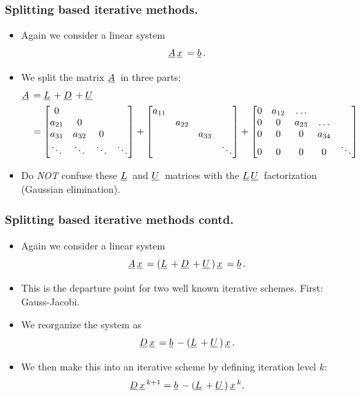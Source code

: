 \documentclass{beamer}
\newcommand{\ub}[1]{\underbar{$#1$}\,}
\begin{document}
\begin{frame}\frametitle{Splitting based iterative methods.}
  \begin{itemize}
    \item Again we consider a linear system
      \[
        \ub{A}\ub{x} = \ub{b}.
      \]
    \item We split the matrix $\ub{A}$ in three parts; \tiny
      \[
        \begin{split}
          \ub{A} &= \ub{L} + \ub{D} + \ub{U} \\
                 &= \begin{bmatrix}
                      0 & \\
                      a_{21} & 0\\
                      a_{31} & a_{32} & 0\\
                      \ddots & \ddots & \ddots & \ddots
                    \end{bmatrix} +
                    \begin{bmatrix}
                      a_{11} \\
                             & a_{22} \\
                             &        & a_{33} \\
                             &        &       & \ddots
                    \end{bmatrix}+
                    \begin{bmatrix}
                      0 & a_{12} & \dots \\
                      0 & 0      & a_{23} & \dots \\
                      0 & 0      & 0      & a_{34}  \\
                      0 & 0      & 0      & 0 & \ddots
                    \end{bmatrix}
        \end{split}
      \] \normalsize
    \item Do \emph{NOT} confuse these $\ub{L}$ and $\ub{U}$ matrices with the $\ub{L}\ub{U}$ factorization (Gaussian elimination).
  \end{itemize}
\end{frame}
\begin{frame}\frametitle{Splitting based iterative methods contd.}
  \begin{itemize}
    \item Again we consider a linear system
      \[
        \ub{A}\ub{x} = \left(\ub{L}+\ub{D}+\ub{U}\right)\ub{x} = \ub{b}.
      \]
    \item This is the departure point for two well known iterative schemes. First: Gauss-Jacobi.
    \item We reorganize the system as
      \[
        \ub{D}\ub{x} = \ub{b}-\left(\ub{L}+\ub{U}\right)\ub{x}.
      \]
    \item We then make this into an iterative scheme by defining iteration level $k$:
      \[
        \ub{D}\ub{x}^{k+1} = \ub{b}-\left(\ub{L}+\ub{U}\right)\ub{x}^{k}.
      \]
  \end{itemize}
\end{frame}
\end{document}
